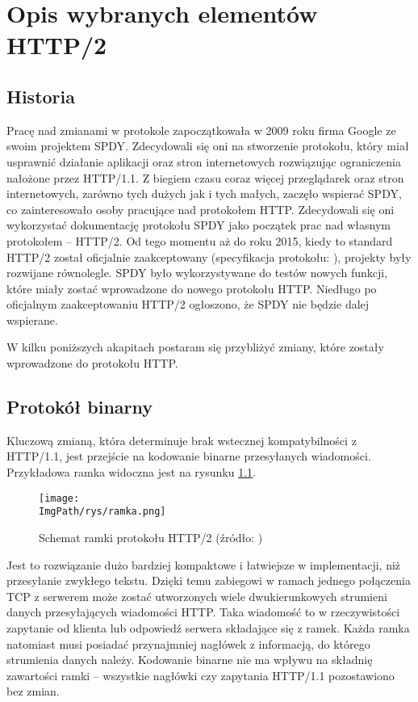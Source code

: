 \documentclass[a4paper,12pt,twoside,openany]{report}
\newcommand{\ImgPath}{.}
\begin{document}
\chapter{Opis wybranych elementów HTTP/2}

\section{Historia}
\label{sectionHistoria}
Pracę nad zmianami w protokole zapoczątkowała w 2009 roku firma Google ze swoim projektem SPDY.
Zdecydowali się oni na stworzenie protokołu, który miał usprawnić działanie aplikacji oraz stron internetowych rozwiązując ograniczenia nałożone przez HTTP/1.1.
Z biegiem czasu coraz więcej przeglądarek oraz stron internetowych, zarówno tych dużych jak i tych małych, zaczęło wspierać SPDY, co zainteresowało osoby pracujące nad protokołem HTTP.
Zdecydowali się oni wykorzystać dokumentację protokołu SPDY jako początek prac nad własnym protokołem -- HTTP/2.
Od tego momentu aż do roku 2015, kiedy to standard HTTP/2 został oficjalnie zaakceptowany 
(specyfikacja protokołu: \cite{RFC7540}), projekty były rozwijane równolegle.
SPDY było wykorzystywane do testów nowych funkcji, które miały zostać wprowadzone do nowego protokołu HTTP.
Niedługo po oficjalnym zaakceptowaniu HTTP/2 ogłoszono, że SPDY nie będzie dalej wspierane.

W kilku poniższych akapitach postaram się przybliżyć zmiany, które zostały wprowadzone do protokołu HTTP.

\section{Protokół binarny}
\label{sectionProtokolBinarny}

Kluczową zmianą, która determinuje brak wstecznej kompatybilności z HTTP/1.1, jest przejście na kodowanie binarne przesyłanych wiadomości. Przykładowa ramka widoczna jest na rysunku \ref{schematRamki}.
\begin{figure}[!htbp]
	\begin{center}
\centering
\texttt{[image: \\ImgPath/rys/ramka.png]}
\end{center}
	\caption{Schemat ramki protokołu HTTP/2 (źródło: \cite{http2Fundamentals})}
	\label{schematRamki}
\end{figure}
Jest to rozwiązanie dużo bardziej kompaktowe i łatwiejsze w implementacji, niż przesyłanie zwykłego tekstu.
Dzięki temu zabiegowi w ramach jednego połączenia TCP z serwerem może zostać utworzonych wiele dwukierunkowych strumieni danych przesyłających wiadomości HTTP.
Taka wiadomość to w rzeczywistości zapytanie od klienta lub odpowiedź serwera składające się z ramek.
Każda ramka natomiast musi posiadać przynajmniej nagłówek z informacją, do którego strumienia danych należy.
Kodowanie binarne nie ma wpływu na składnię zawartości ramki -- wszystkie nagłówki czy zapytania HTTP/1.1 pozostawiono bez zmian.
\end{document}
